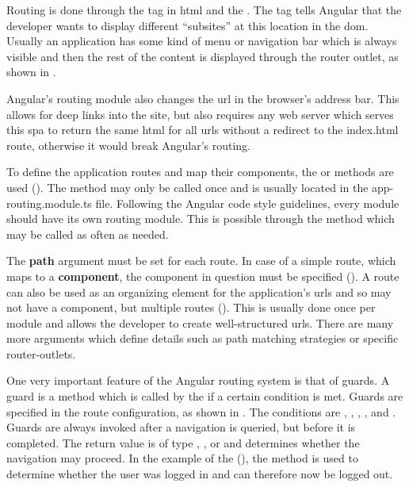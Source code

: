 Routing is done through the  tag in \gls{html} and the . The  tag tells Angular that the developer wants to display different \enquote{subsites} at this location in the \gls{dom}. Usually an application has some kind of menu or navigation bar which is always visible and then the rest of the content is displayed through the router outlet, as shown in .

Angular's routing module also changes the \gls{url} in the browser's address bar. This allows for deep links into the site, but also requires any web server which serves this \gls{spa} to return the same \gls{html} for all \glspl{url} without a redirect to the index.html route, otherwise it would break Angular's routing.


To define the application routes and map their components, the  or  methods are used (). The  method may only be called once and is usually located in the app-routing.module.ts file. Following the Angular code style guidelines, every module should have its own routing module. This is possible through the  method which may be called as often as needed.

The \textbf{path} argument must be set for each route. In case of a simple route, which maps to a \textbf{component}, the component in question must be specified (). A route can also be used as an organizing element for the application's \glspl{url} and so may not have a component, but multiple routes (). This is usually done once per module and allows the developer to create well-structured \glspl{url}. There are many more arguments which define details such as path matching strategies or specific router-outlets.



One very important feature of the Angular routing system is that of guards. A guard is a method which is called by the  if a certain condition is met. Guards are specified in the route configuration, as shown in . The conditions are , , , , and . Guards are always invoked after a navigation is queried, but before it is completed. The return value is of type , , or  and determines whether the navigation may proceed. In the example of the  (), the  method is used to determine whether the user was logged in and can therefore now be logged out.

